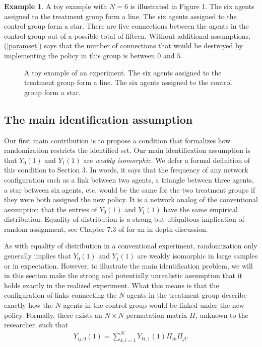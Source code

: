 \documentclass[12pt]{article}
\theoremstyle{definition}
\newtheorem{myexp}{Example}
\begin{document}
\begin{myexp}
A toy example with $N = 6$ is illustrated in Figure 1. The six agents assigned to the treatment group form a line. The six agents assigned to the control group form a star.  There are five connections between the agents in the control group out of a possible total of fifteen. Without additional assumptions,  (\ref{paramset}) says that the number of connections that would be destroyed by implementing the policy in this group is between $0$ and $5$.   
\end{myexp}

\begin{figure}
\centering

\vspace{-6mm}
\caption{A toy example of an experiment. The six agents assigned to the treatment group form a line. The six agents assigned to the control group form a star.}
\label{fig:toyexample_problem}
\end{figure}

\subsection{The main identification assumption}
Our first main contribution is to propose a condition that formalizes how randomization restricts the identified set. Our main identification assumption is that $Y_{0}(1)$ and $Y_{1}(1)$ are \emph{weakly isomorphic}. We defer a formal definition of this condition to Section 3. In words, it says that the frequency of any network configuration such as a link between two agents, a triangle between three agents, a star between six agents, etc. would be the same for the two treatment groups if they were both assigned the new policy. It is a network analog of the conventional assumption that the entries of $Y_{0}(1)$ and $Y_{1}(1)$ have the same empirical distribution. Equality of distribution is a strong but ubiquitous implication of random assignment, see Chapter 7.3 of \cite{manski2009identification} for an in depth discussion. 

As with equality of distribution in a conventional experiment, randomization only generally implies that $Y_{0}(1)$ and $Y_{1}(1)$ are weakly isomorphic in large samples or in expectation. However, to illustrate the main identification problem, we will in this section make the strong and potentially unrealistic assumption that it holds exactly in the realized experiment. What this means is that the configuration of links connecting the $N$ agents in the treatment group describe exactly how the $N$ agents in the control group would be linked under the new policy. Formally, there exists an $N\times N$ permutation matrix $\Pi$, unknown to the researcher, such that   
\begin{align}\label{simAss}
Y_{ij,0}(1) = \sum_{k,l=1}^{N}Y_{kl,1}(1)\Pi_{ik}\Pi_{jl}.
\end{align}
\end{document}

